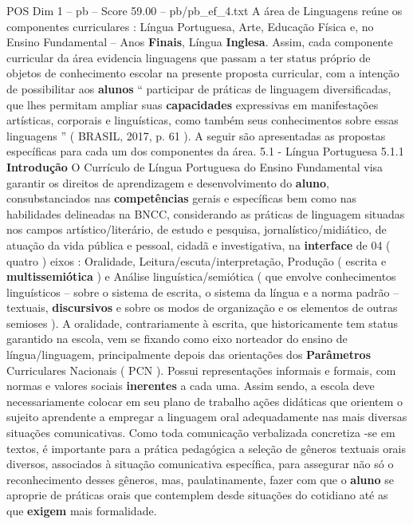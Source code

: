 \begin{textsample}{POS Dim 1 – pb – Score 59.00 – pb/pb\_ef\_4.txt}  \label{ex:f1_pos_143}
A área de Linguagens reúne os componentes curriculares : Língua Portuguesa, Arte, Educação Física e, no Ensino Fundamental – Anos \textbf{Finais}, Língua \textbf{Inglesa}.
Assim, cada componente curricular da área evidencia linguagens que passam a ter status próprio de objetos de conhecimento escolar na presente proposta curricular, com a intenção de possibilitar aos \textbf{alunos} “ participar de práticas de linguagem diversificadas, que lhes permitam ampliar suas \textbf{capacidades} expressivas em manifestações artísticas, corporais e linguísticas, como também seus conhecimentos sobre essas linguagens ” ( BRASIL, 2017, p. 61 ).
A seguir são apresentadas as propostas específicas para cada um dos componentes da área. 5.1 - Língua Portuguesa 5.1.1 \textbf{Introdução} O Currículo de Língua Portuguesa do Ensino Fundamental visa garantir os direitos de aprendizagem e desenvolvimento do \textbf{aluno}, consubstanciados nas \textbf{competências} gerais e específicas bem como nas habilidades delineadas na BNCC, considerando as práticas de linguagem situadas nos campos artístico/literário, de estudo e pesquisa, jornalístico/midiático, de atuação da vida pública e pessoal, cidadã e investigativa, na \textbf{interface} de 04 ( quatro ) eixos : Oralidade, Leitura/escuta/interpretação, Produção ( escrita e \textbf{multissemiótica} ) e Análise linguística/semiótica ( que envolve conhecimentos linguísticos – sobre o sistema de escrita, o sistema da língua e a norma padrão – textuais, \textbf{discursivos} e sobre os modos de organização e os elementos de outras semioses ).
A oralidade, contrariamente à escrita, que historicamente tem status garantido na escola, vem se fixando como eixo norteador do ensino de língua/linguagem, principalmente depois das orientações dos \textbf{Parâmetros} Curriculares Nacionais ( PCN ).
Possui representações informais e formais, com normas e valores sociais \textbf{inerentes} a cada uma.
Assim sendo, a escola deve necessariamente colocar em seu plano de trabalho ações didáticas que orientem o sujeito aprendente a empregar a linguagem oral adequadamente nas mais diversas situações comunicativas.
Como toda comunicação verbalizada concretiza -se em textos, é importante para a prática pedagógica a seleção de gêneros textuais orais diversos, associados à situação comunicativa específica, para assegurar não só o reconhecimento desses gêneros, mas, paulatinamente, fazer com que o \textbf{aluno} se aproprie de práticas orais que contemplem desde situações do cotidiano até as que \textbf{exigem} mais formalidade.

\end{textsample}
